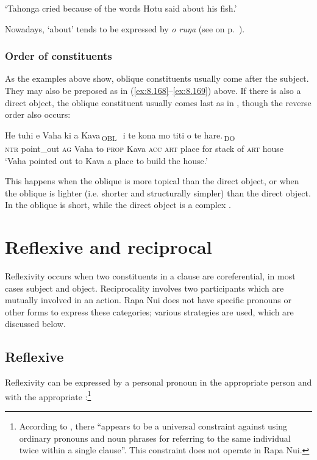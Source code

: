 \glt
‘Tahonga cried because of the words Hotu said about his fish.’ \textstyleExampleref{[R301.295]} 
\z

Nowadays, ‘about’ tends to be expressed by \textit{o ruŋa} (see  on p.~\pageref{ex:3.152}).

\subsubsection{Order of constituents}
As the examples above show, oblique constituents usually come after the subject. They may also be preposed as in (\ref{ex:8.168}–\ref{ex:8.169}) above. If there is also a direct object, the oblique constituent usually comes last as in , though the reverse order also occurs:

\ea\label{ex:8.184}
\gll He tuhi e Vaha {\ob}ki a Kava\,{\cb}\textsubscript{\textup{OBL~}} {\ob}i te kona mo titi o te hare.\,{\cb}\textsubscript{\textup{DO}}\\
\textsc{ntr} point\_out \textsc{ag} Vaha {\db}to \textsc{prop} Kava {\db}\textsc{acc} \textsc{art} place for stack of \textsc{art} house\\

\glt
‘Vaha pointed out to Kava a place to build the house.’ \textstyleExampleref{[R229.110]} 
\z

This happens when the oblique is more topical than the direct object, or when the oblique is lighter (i.e. shorter and structurally simpler) than the direct object. In  the oblique is short, while the direct object is a complex .
\section{Reflexive and reciprocal}\label{sec:8.9}
Reflexivity occurs when two constituents in a clause are coreferential, in most cases subject and object. Reciprocality involves two participants which are mutually involved in an action. Rapa Nui does not have specific pronouns or other forms to express these categories; various strategies are used, which are discussed below.

\subsection{Reflexive}
Reflexivity can be expressed by a personal pronoun in the appropriate person and with the appropriate :\footnote{\label{fn:446}According to \citet[265]{AndersonKeenan1985}, there “appears to be a universal constraint against using ordinary pronouns and noun phrases for referring to the same individual twice within a single clause”. This constraint does not operate in Rapa Nui.}

